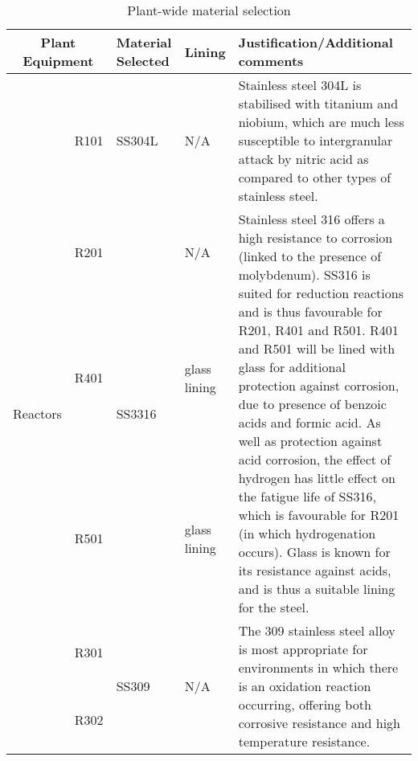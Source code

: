 

\begin{table}[H]
\centering
\caption{Plant-wide material selection}
\label{tab:material}
\begin{tabular}{@{}p{3cm}|p{3cm}|p{3cm}|p{3cm}|p{3cm}@{}}
\toprule
\multicolumn{2}{c}{\textbf{Plant Equipment}}                                                                    & \textbf{Material   Selected}                                                                  & \textbf{Lining}                                    & \textbf{Justification/Additional   comments}          \\ \midrule
 \multirow{6}{*}{Reactors}    & R101                                                     & SS304L                                                                                        & N/A                                                & Stainless   steel 304L is stabilised with titanium and niobium, which are much less   susceptible to intergranular attack by nitric acid as compared to other types   of stainless steel.\\
     & R201     &   \multirow{3}{*}{SS3316}      & N/A      &  \multirow{3}{*}{Stainless   steel 316 offers a high resistance to corrosion (linked to the presence of   molybdenum). SS316 is suited for reduction reactions and is thus favourable   for R201, R401 and R501. R401 and R501 will be lined with glass for additional   protection against corrosion, due to presence of benzoic acids and formic   acid. As well as protection against acid corrosion, the effect of hydrogen   has little effect on the fatigue life of SS316, which is favourable for R201   (in which hydrogenation occurs). Glass is known for its resistance against   acids, and is thus a suitable lining for the steel.}                                  \\
        & R401       &          & glass lining       &   \\
   & R501                                                     &          & glass lining                                       &  \\
    & R301        &        \multirow{2}{*}{SS309}          &  \multirow{2}{*}{N/A}     &      \multirow{2}{*}{The   309 stainless steel alloy is most appropriate for environments in which there   is an oxidation reaction occurring, offering both corrosive resistance and   high temperature resistance.}                    \\
          & R302  &                                                                       &                             &  \\ \midrule

\end{tabular}
\end{table}
